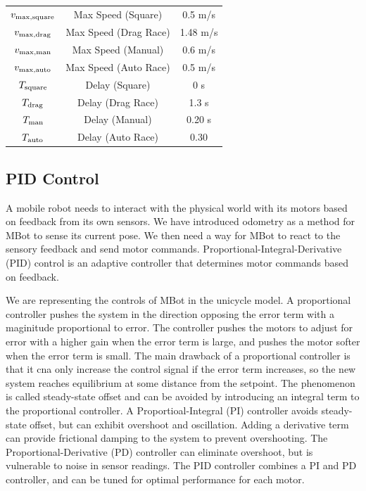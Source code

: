 \documentclass[conference]{IEEEtran}
\begin{document}
\begin{table}[h]
\begin{center}
\begin{tabular}{|c| c| c|}
    $v_{\rm max,square}$ &Max Speed (Square) & 0.5 m/s\\
    $v_{\rm max,drag}$ &Max Speed (Drag Race) & 1.48 m/s\\
    $v_{\rm max,man}$ &Max Speed (Manual) & 0.6 m/s\\
    $v_{\rm max,auto}$ &Max Speed (Auto Race) & 0.5 m/s\\
    $T_{\rm square}$ &Delay (Square) & 0 s\\
    $T_{\rm drag}$ &Delay (Drag Race) & 1.3 s\\
    $T_{\rm man}$ &Delay (Manual) & 0.20 s\\
    $T_{\rm auto}$ &Delay (Auto Race) & 0.30\\
\hline
\end{tabular}
\end{center}
\end{table}


\subsection{PID Control}
A mobile robot needs to interact with the physical world with its motors based on feedback from its own sensors. We have introduced odometry as a method for MBot to sense its current pose. We then need a way for MBot to react to the sensory feedback and send motor commands. Proportional-Integral-Derivative (PID) control is an adaptive controller that determines motor commands based on feedback. 

We are representing the controls of MBot in the unicycle model. A proportional controller pushes the system in the direction opposing the error term with a maginitude proportional to error. The controller pushes the motors to adjust for error with a higher gain when the error term is large, and pushes the motor softer when the error term is small. The main drawback of a proportional controller is that it cna only increase the control signal if the error term increases, so the new system reaches equilibrium at some distance from the setpoint. The phenomenon is called steady-state offset and can be avoided by introducing an integral term to the proportional controller. A Proportioal-Integral (PI) controller avoids steady-state offset, but can exhibit overshoot and oscillation. Adding a derivative term can provide frictional damping to the system to prevent overshooting. The Proportional-Derivative (PD) controller can eliminate overshoot, but is vulnerable to noise in sensor readings. The PID controller combines a PI and PD controller, and can be tuned for optimal performance for each motor.
\end{document}
